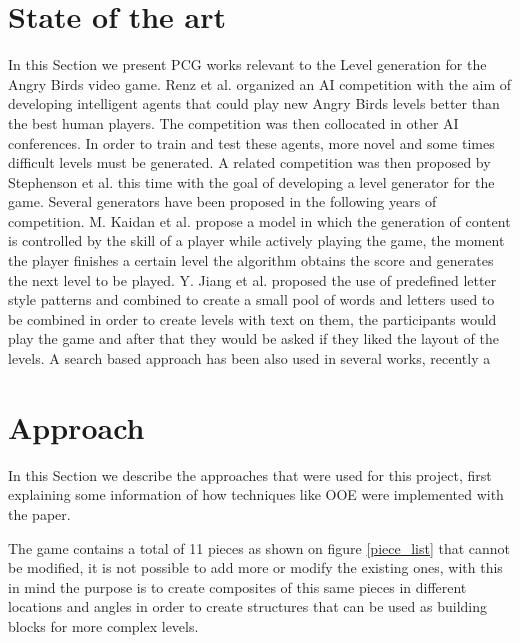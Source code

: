 \documentclass[conference]{IEEEtran}
\begin{document}
\section{State of the art}
\label{SoA}
In this Section we present PCG works relevant to the Level generation for the
Angry Birds video game. Renz et al. \cite{Renz, Renz2015TheAB} organized an AI
competition with the aim of developing intelligent agents that could play new
Angry Birds levels better than the best human players. The competition was then
collocated in other AI conferences. In order to train and test these agents,
more novel and some times difficult levels must be generated. A related
competition was then proposed by Stephenson et al. \cite{Stephenson} this time
with the goal of developing a level generator for the game. Several generators
have been proposed in the following years of competition. M. Kaidan et al.
\cite{Kaidan2015} propose a model in which the generation of content is
controlled by the skill of a player while actively playing the game, the moment
the player finishes a certain level the algorithm obtains the score and
generates the next level to be played. Y. Jiang et al. \cite{Jiang2017} proposed
the use of predefined letter style patterns and combined to create a small pool
of words and letters used to be combined in order to create levels with text on
them, the participants would play the game and after that they would be asked if
they liked the layout of the levels. A search based approach has been also used
in several works, recently a   

\section{Approach}

In this Section we describe the approaches that were used for this project, first 
explaining some information of how techniques like OOE were implemented with the paper.

The game contains a total of 11 pieces as shown on figure \ref{piece_list} that
cannot be modified, it is not possible to add more or modify the existing ones,
with this in mind the purpose is to create composites of this same pieces in
different locations and angles in order to create structures that can be used as
building blocks for more complex levels. 
\end{document}
